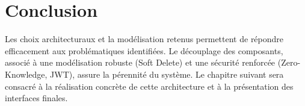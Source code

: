 \section*{Conclusion}
Les choix architecturaux et la modélisation retenus permettent de répondre efficacement aux problématiques identifiées. Le découplage des composants, associé à une modélisation robuste (Soft Delete) et une sécurité renforcée (Zero-Knowledge, JWT), assure la pérennité du système. Le chapitre suivant sera consacré à la réalisation concrète de cette architecture et à la présentation des interfaces finales.